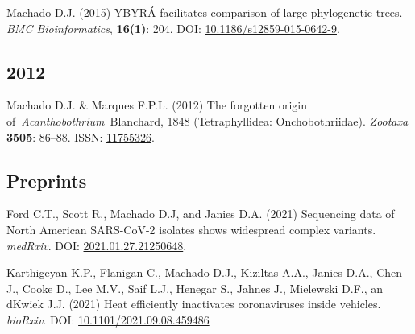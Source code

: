\documentclass[11pt, letterpaper, sans]{moderncv}
\begin{document}
    {\setlength{\parskip}{.5em}\renewcommand{\baselinestretch}{2.0}\begin{hangparas}{.25in}{1}
		Machado D.J. (2015) YBYRÁ facilitates comparison of large phylogenetic trees. \emph{BMC Bioinformatics}, \textbf{16(1)}: 204. DOI: \href{https://doi.org/10.1186/s12859-015-0642-9}{10.1186/s12859-015-0642-9}.
	\end{hangparas}}


\subsection{2012}

    {\setlength{\parskip}{.5em}\renewcommand{\baselinestretch}{2.0}\begin{hangparas}{.25in}{1}
		Machado D.J. \& Marques F.P.L. (2012) The forgotten origin of~\emph{Acanthobothrium}~Blanchard, 1848 (Tetraphyllidea: Onchobothriidae). \emph{Zootaxa} \textbf{3505}: 86--88. ISSN: \href{http://www.mapress.com/zootaxa/2012/f/z03505p088f.pdf}{11755326}.
	\end{hangparas}}


%


\subsection{Preprints}

	{
		\setlength{\parskip}{.5em}\renewcommand{\baselinestretch}{2.0}
		\begin{hangparas}{.25in}{1}

		Ford C.T., Scott R.,  Machado D.J, and  Janies D.A. (2021) Sequencing data of North American SARS-CoV-2 isolates shows widespread complex variants. \textit{medRxiv}. DOI: \href{https://doi.org/10.1101/2021.01.27.21250648}{2021.01.27.21250648}.

		Karthigeyan K.P., Flanigan C., Machado D.J., Kiziltas A.A., Janies D.A., Chen J., Cooke D., Lee M.V., Saif L.J., Henegar S., Jahnes J., Mielewski D.F., an dKwiek J.J. (2021) Heat efficiently inactivates coronaviruses inside vehicles. \textit{bioRxiv}. DOI: \href{https://doi.org/10.1101/2021.09.08.459486}{10.1101/2021.09.08.459486}

		\end{hangparas}
	}
\end{document}
